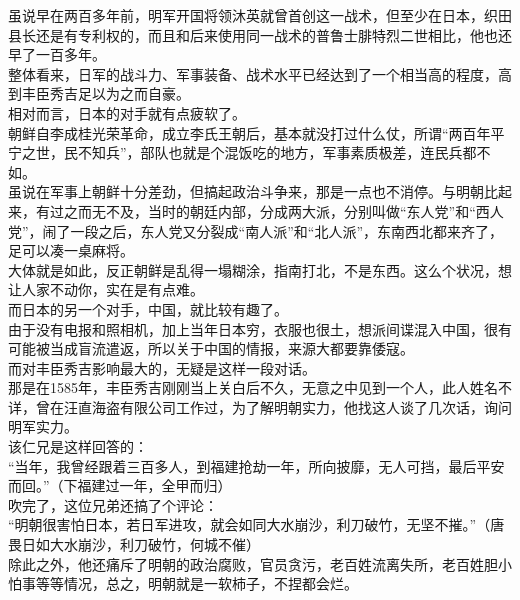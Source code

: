 \begin{multicols}{\theparacolNo}
虽说早在两百多年前，明军开国将领沐英就曾首创这一战术，但至少在日本，织田县长还是有专利权的，而且和后来使用同一战术的普鲁士腓特烈二世相比，他也还早了一百多年。\\

整体看来，日军的战斗力、军事装备、战术水平已经达到了一个相当高的程度，高到丰臣秀吉足以为之而自豪。\\

相对而言，日本的对手就有点疲软了。\\

朝鲜自李成桂光荣革命，成立李氏王朝后，基本就没打过什么仗，所谓“两百年平宁之世，民不知兵”，部队也就是个混饭吃的地方，军事素质极差，连民兵都不如。\\

虽说在军事上朝鲜十分差劲，但搞起政治斗争来，那是一点也不消停。与明朝比起来，有过之而无不及，当时的朝廷内部，分成两大派，分别叫做“东人党”和“西人党”，闹了一段之后，东人党又分裂成“南人派”和“北人派”，东南西北都来齐了，足可以凑一桌麻将。\\

大体就是如此，反正朝鲜是乱得一塌糊涂，指南打北，不是东西。这么个状况，想让人家不动你，实在是有点难。\\

而日本的另一个对手，中国，就比较有趣了。\\

由于没有电报和照相机，加上当年日本穷，衣服也很土，想派间谍混入中国，很有可能被当成盲流遣返，所以关于中国的情报，来源大都要靠倭寇。\\

而对丰臣秀吉影响最大的，无疑是这样一段对话。\\

那是在1585年，丰臣秀吉刚刚当上关白后不久，无意之中见到一个人，此人姓名不详，曾在汪直海盗有限公司工作过，为了解明朝实力，他找这人谈了几次话，询问明军实力。\\

该仁兄是这样回答的：\\

“当年，我曾经跟着三百多人，到福建抢劫一年，所向披靡，无人可挡，最后平安而回。”（下福建过一年，全甲而归）\\

吹完了，这位兄弟还搞了个评论：\\

“明朝很害怕日本，若日军进攻，就会如同大水崩沙，利刀破竹，无坚不摧。”（唐畏日如大水崩沙，利刀破竹，何城不催）\\

除此之外，他还痛斥了明朝的政治腐败，官员贪污，老百姓流离失所，老百姓胆小怕事等等情况，总之，明朝就是一软柿子，不捏都会烂。\\


\end{multicols}
